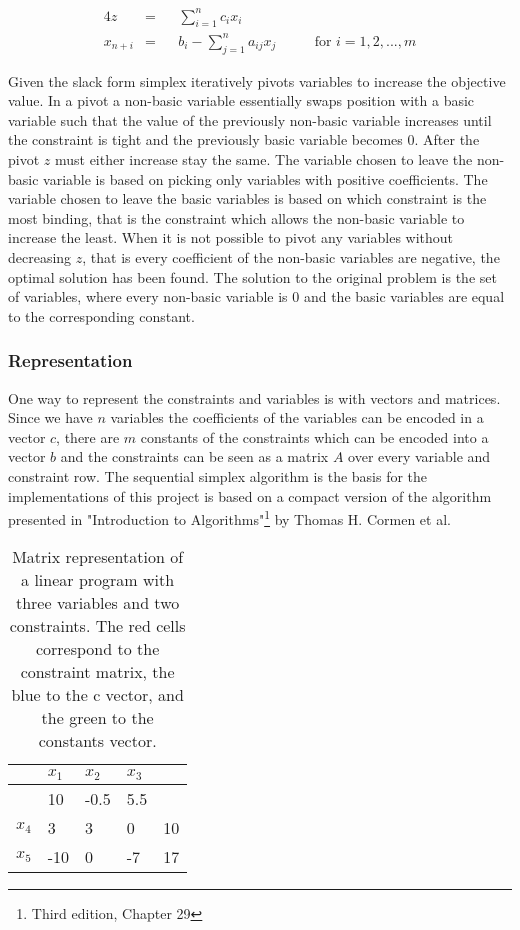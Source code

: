 \begin{alignat*}{4}
z        &= && \sum_{i=1}^{n} c_ix_i\\
x_{n+i}  &= && b_i - \sum_{j=1}^{n} a_{ij} x_j  &&& \text{ for } i=1,2,...,m
\end{alignat*}

Given the slack form simplex iteratively pivots variables to increase the objective value. In a pivot a non-basic variable essentially swaps position with a basic variable such that the value of the previously non-basic variable increases until the constraint is tight and the previously basic variable becomes $0$. After the pivot $z$ must either increase stay the same. The variable chosen to leave the non-basic variable is based on picking only variables with positive coefficients. The variable chosen to leave the basic variables is based on which constraint is the most binding, that is the constraint which allows the non-basic variable to increase the least. When it is not possible to pivot any variables without decreasing $z$, that is every coefficient of the non-basic variables are negative, the optimal solution has been found. The solution to the original problem is the set of variables, where every non-basic variable is $0$ and the basic variables are equal to the corresponding constant.


\subsubsection{Representation}
One way to represent the constraints and variables is with vectors and matrices. Since we have $n$ variables the coefficients of the variables can be encoded in a vector $c$, there are $m$ constants of the constraints which can be encoded into a vector $b$ and the constraints can be seen as a matrix $A$ over every variable and constraint row. The sequential simplex algorithm is the basis for the implementations of this project is based on a compact version of the algorithm presented in "Introduction to Algorithms"\footnote{Third edition, Chapter 29} by Thomas H. Cormen et al.
	
\begin{table}[H]
	\centering
	\label{my-label}
	\begin{tabular}{|l|l|l|l|l|}
		\hline
		& $x_1$                       & $x_2$                        & $x_3$                       &                            \\ \hline
		& \cellcolor[HTML]{ECF4FF}10  & \cellcolor[HTML]{ECF4FF}-0.5 & \cellcolor[HTML]{ECF4FF}5.5 &                            \\ \hline
		$x_4$ & \cellcolor[HTML]{FFCCC9}3   & \cellcolor[HTML]{FFCCC9}3    & \cellcolor[HTML]{FFCCC9}0   & \cellcolor[HTML]{9AFF99}10 \\ \hline
		$x_5$ & \cellcolor[HTML]{FFCCC9}-10 & \cellcolor[HTML]{FFCCC9}0    & \cellcolor[HTML]{FFCCC9}-7  & \cellcolor[HTML]{9AFF99}17 \\ \hline
	\end{tabular}
	\caption{Matrix representation of a linear program with three variables and two constraints. The red cells correspond to the constraint matrix,  the blue to the c vector, and the green to the constants vector.}
\end{table}
